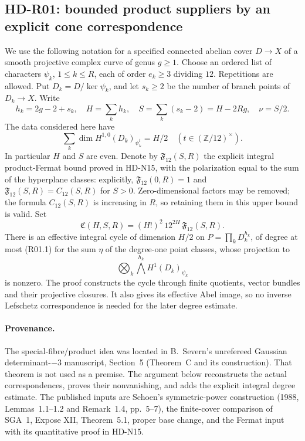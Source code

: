 \subsection{HD-R01: bounded product suppliers by an explicit cone correspondence}
\label{sec:HD-R01}

We use the following notation for a specified connected abelian cover
$D\to X$ of a smooth projective complex curve of genus $g\ge1$.
Choose an ordered list of characters $\psi_k$, $1\le k\le R$, each
of order $e_k\ge3$ dividing $12$. Repetitions are allowed. Put
$D_k=D/\ker\psi_k$, and let $s_k\ge2$ be the number of branch
points of $D_k\to X$. Write
\[
 h_k=2g-2+s_k,\quad H=\sum_kh_k,\quad
 S=\sum_k(s_k-2)=H-2Rg,\quad \nu=S/2.
\]
The data considered here have
\[
 \sum_k\dim H^{1,0}(D_k)_{\psi_k^t}=H/2
       \quad(t\in(\mathbb Z/12)^\times).
\]
In particular $H$ and $S$ are even. Denote by
$\mathfrak F_{12}(S,R)$ the explicit integral product-Fermat bound
proved in HD-N15, with the polarization equal to the sum of the
hyperplane classes: explicitly, $\mathfrak F_{12}(0,R)=1$ and
$\mathfrak F_{12}(S,R)=C_{12}(S,R)$ for $S>0$. Zero-dimensional
factors may be removed; the formula $C_{12}(S,R)$ is increasing
in $R$, so retaining them in this upper bound is valid. Set
\begin{equation}
 \mathfrak C(H,S,R)=(H!)^2\,12^{2H}\,
                         \mathfrak F_{12}(S,R).       \tag{R01.1}
\end{equation}
There is an effective integral cycle of dimension $H/2$ on
$P=\prod_kD_k^{h_k}$, of degree at most (R01.1) for the sum
$\eta$ of the degree-one point classes, whose projection to
\[
        \bigotimes_k\bigwedge^{h_k}H^1(D_k)_{\psi_k}
                                                        \tag{R01.2}
\]
is nonzero. The proof constructs the cycle through finite quotients,
vector bundles and their projective closures. It also gives its
effective Abel image, so no inverse Lefschetz correspondence is
needed for the later degree estimate.

\paragraph{Provenance.}
The special-fibre/product idea was located in B.~Severn's unrefereed
Gaussian determinant-$-3$ manuscript, Section~5 (Theorem~C and its
construction). That theorem is not used as a premise. The argument
below reconstructs the actual correspondences, proves their
nonvanishing, and adds the explicit integral degree estimate.
The published inputs are Schoen's symmetric-power construction
(1988, Lemmas~1.1--1.2 and Remark~1.4, pp.~5--7), the finite-cover
comparison of SGA~1, Expose XII, Theorem~5.1, proper base change,
and the Fermat input with its quantitative proof in HD-N15.

